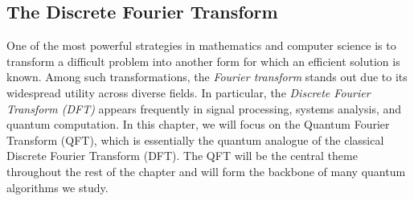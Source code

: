 \subsection{The Discrete Fourier Transform}
One of the most powerful strategies in mathematics and computer science is to transform a difficult problem into another form for which an efficient solution is known. Among such transformations, the \textit{Fourier transform} stands out due to its widespread utility across diverse fields. In particular, the \textit{Discrete Fourier Transform (DFT)} appears frequently in signal processing, systems analysis, and quantum computation. In this chapter, we will focus on the Quantum Fourier Transform (QFT), which is essentially the quantum analogue of the classical Discrete Fourier Transform (DFT). The QFT will be the central theme throughout the rest of the chapter and will form the backbone of many quantum algorithms we study.

